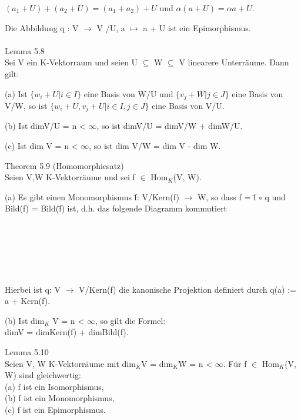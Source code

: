 \begin{center}
$(a_1 + U)+(a_2 + U)=(a_1 +a_2)+U$ und $\alpha(a+U)=\alpha a+U$.
\end{center} 
Die Abbildung q : V $\to$ V /U, a $\mapsto$ a + U ist ein Epimorphismus.\\
\\
Lemma 5.8\\
Sei V ein K-Vektorraum und seien U $\subseteq$ W $\subseteq$ V linearere Unterräume. Dann gilt:
\begin{compactenum}
\item[(a)] Ist $\{w_i + U | i \in I\}$ eine Basis von W/U und $\{v_j + W | j \in J\}$ eine Basis von V/W, so ist $\{w_i +U, v_j +U | i \in I, j \in J\}$ eine Basis von V/U.
\item[(b)] Ist dimV/U = n < $\infty$, so ist dimV/U = dimV/W + dimW/U.
\item[(c)] Ist dim V = n < $\infty$, so ist dim V/W = dim V - dim W.\\
\end{compactenum}
Theorem 5.9 (Homomorphiesatz)\\
Seien V,W K-Vektorräume und sei f $\in$ Hom$_K$(V, W).
\begin{compactenum}
\item[(a)] Es gibt einen Monomorphismus \={f}: V/Kern(f) $\to$ W, so dass f = \={f} $\circ$ q und Bild(f) = Bild(\={f}) ist, d.h. das folgende Diagramm kommutiert\\
\\
\\
\\
\\
\\
\\
Hierbei ist q: V $\to$ V/Kern(f) die kanonische Projektion definiert durch q(a) := a + Kern(f).
\item[(b)] Ist dim$_K$ V = n < $\infty$, so gilt die Formel: \\
dimV = dimKern(f) + dimBild(f).\\
\end{compactenum}
Lemma 5.10\\
Seien V, W K-Vektorräume mit dim$_K$V = dim$_K$W = n < $\infty$. Für f $\in$ Hom$_K$(V, W) sind gleichwertig: \\
(a) f ist ein Isomorphismus, \\
(b) f ist ein Monomorphismus,\\ 
(c) f ist ein Epimorphismus. \\
